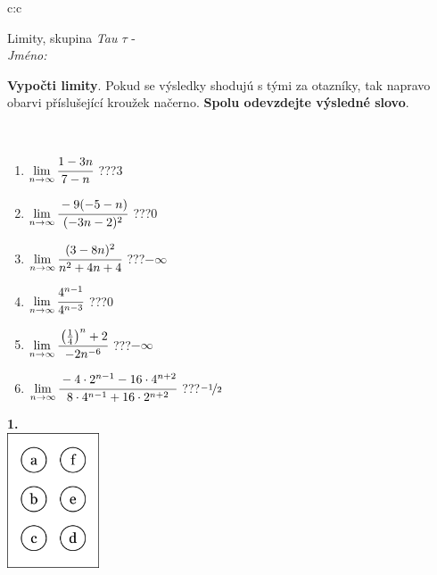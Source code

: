 \documentclass[10pt]{report}
\begin{document}
\begin{tabular}{c:c}
\begin{minipage}[c][104.5mm][t]{0.5\linewidth}
\begin{center}
\vspace{7mm}
{\huge Limity, skupina \textit{Tau $\tau$} -}\\[5mm]
\textit{Jméno:}\phantom{xxxxxxxxxxxxxxxxxxxxxxxxxxxxxxxxxxxxxxxxxxxxxxxxxxxxxxxxxxxxxxxxx}\\[5mm]
\begin{minipage}{0.95\linewidth}
\begin{center}
\textbf{Vypočti limity}. Pokud se výsledky shodujú s tými za otazníky, tak napravo\\obarvi příslušející kroužek načerno. \textbf{Spolu odevzdejte výsledné slovo}.
\end{center}
\end{minipage}
\\[1mm]
\begin{minipage}{0.79\linewidth}
\begin{center}
\begin{varwidth}{\linewidth}
\begin{enumerate}
\normalsize
\item $\lim\limits_{n\to\infty}\cfrac{1-3n}{7-n}$\quad \dotfill\; ???\;\dotfill \quad $3$
\item $\lim\limits_{n\to\infty}\cfrac{-9(-5-n)}{(-3n-2)^2}$\quad \dotfill\; ???\;\dotfill \quad $0$
\item $\lim\limits_{n\to\infty}\cfrac{(3-8n)^2}{n^2+4n+4}$\quad \dotfill\; ???\;\dotfill \quad $-\infty$
\item $\lim\limits_{n\to\infty}\cfrac{4^{n-1}}{4^{n-3}}$\quad \dotfill\; ???\;\dotfill \quad $0$
\item $\lim\limits_{n\to\infty}\cfrac{\left(\frac{1}{4}\right)^n +2}{-2n^{-6}}$\quad \dotfill\; ???\;\dotfill \quad $-\infty$
\item $\lim\limits_{n\to\infty}\cfrac{-4\cdot 2^{n-1}-16\cdot 4^{n+2}}{8\cdot 4^{n-1}+16\cdot 2^{n+2}}$\quad \dotfill\; ???\;\dotfill \quad $\nicefrac{-1}{2}$
\end{enumerate}
\end{varwidth}
\end{center}
\end{minipage}
\begin{minipage}{0.20\linewidth}
\begin{center}
{\Huge\bfseries 1.} \\[2mm]
\includegraphics[height=40mm]{../images/braille.png}

\end{center}
\end{minipage}
\end{center}
\end{minipage}
\end{tabular}
\end{document}
